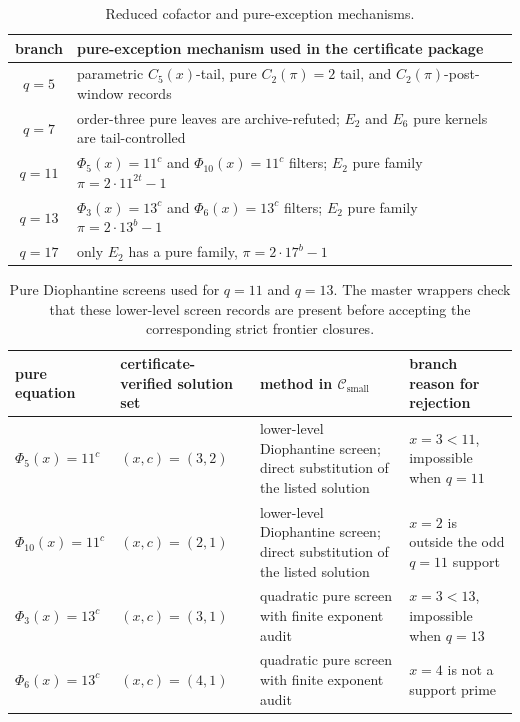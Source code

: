 \documentclass[11pt]{article}
\theoremstyle{definition}
\theoremstyle{remark}
\newcommand{\Csmall}{\ensuremath{\mathcal C_{\mathrm{small}}}}
\begin{document}
\begin{table}[ht]
\centering
\small
\begin{tabular}{c|l}
\toprule
branch & pure-exception mechanism used in the certificate package\\
\midrule
\(q=5\) &
parametric \(C_5(x)\)-tail, pure \(C_2(\pi)=2\) tail, and \(C_2(\pi)\)-post-window records\\
\(q=7\) &
order-three pure leaves are archive-refuted; \(E_2\) and \(E_6\) pure kernels are tail-controlled\\
\(q=11\) &
\(\Phi_5(x)=11^c\) and \(\Phi_{10}(x)=11^c\) filters; \(E_2\) pure family \(\pi=2\cdot11^{2t}-1\)\\
\(q=13\) &
\(\Phi_3(x)=13^c\) and \(\Phi_6(x)=13^c\) filters; \(E_2\) pure family \(\pi=2\cdot13^b-1\)\\
\(q=17\) &
only \(E_2\) has a pure family, \(\pi=2\cdot17^b-1\)\\
\bottomrule
\end{tabular}
\caption{Reduced cofactor and pure-exception mechanisms.}
\label{tab:pure-exceptions}
\end{table}

\begin{table}[ht]
\centering
\small
\begin{tabularx}{\textwidth}{>{\raggedright\arraybackslash}p{}
  >{\raggedright\arraybackslash}p{}
  >{\raggedright\arraybackslash}X
  >{\raggedright\arraybackslash}p{}}
\toprule
pure equation & certificate-verified solution set & method in \(\Csmall\) & branch reason for rejection\\
\midrule
\(\Phi_5(x)=11^c\) & \((x,c)=(3,2)\) &
lower-level Diophantine screen; direct substitution of the listed solution &
\(x=3<11\), impossible when \(q=11\)\\
\(\Phi_{10}(x)=11^c\) & \((x,c)=(2,1)\) &
lower-level Diophantine screen; direct substitution of the listed solution &
\(x=2\) is outside the odd \(q=11\) support\\
\(\Phi_3(x)=13^c\) & \((x,c)=(3,1)\) &
quadratic pure screen with finite exponent audit &
\(x=3<13\), impossible when \(q=13\)\\
\(\Phi_6(x)=13^c\) & \((x,c)=(4,1)\) &
quadratic pure screen with finite exponent audit &
\(x=4\) is not a support prime\\
\bottomrule
\end{tabularx}
\caption{Pure Diophantine screens used for \(q=11\) and \(q=13\).  The master
wrappers check that these lower-level screen records are present before
accepting the corresponding strict frontier closures.}
\label{tab:pure-screen-details}
\end{table}
\end{document}
